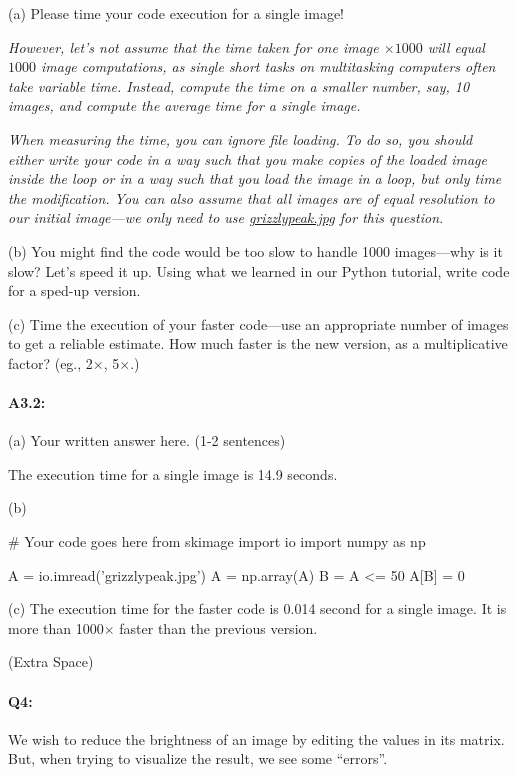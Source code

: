 \documentclass[11pt]{article}
\begin{document}
(a) Please time your code execution for a single image!

\emph{However, let's not assume that the time taken for one image $\times1000$ will equal $1000$ image computations, as single short tasks on multitasking computers often take variable time. Instead, compute the time on a smaller number, say, 10 images, and compute the average time for a single image.}

\emph{When measuring the time, you can ignore file loading. To do so, you should either write your code in a way such that you make copies of the loaded image inside the loop or in a way such that you load the image in a loop, but only time the modification. You can also assume that all images are of equal resolution to our initial image---we only need to use \href{grizzlypeak.jpg}{grizzlypeak.jpg} for this question.}

(b) You might find the code would be too slow to handle 1000 images---why is it slow? Let's speed it up. Using what we learned in our Python tutorial, write code for a sped-up version.

(c) Time the execution of your faster code---use an appropriate number of images to get a reliable estimate. How much faster is the new version, as a multiplicative factor? (eg., 2$\times$, 5$\times$.)

\paragraph{A3.2:} 

(a) Your written answer here. (1-2 sentences)

The execution time for a single image is 14.9 seconds.

(b) 
\begin{python}
# Your code goes here
from skimage import io
import numpy as np

A = io.imread('grizzlypeak.jpg')
A = np.array(A)
B = A <= 50
A[B] = 0
\end{python}

(c) The execution time for the faster code is 0.014 second for a single image. It is more than 1000$\times$ faster than the previous version.

 (Extra Space)



\pagebreak
\paragraph{Q4:} We wish to reduce the brightness of an image by editing the values in its matrix. But, when trying to visualize the result, we see some ``errors''.
\end{document}
